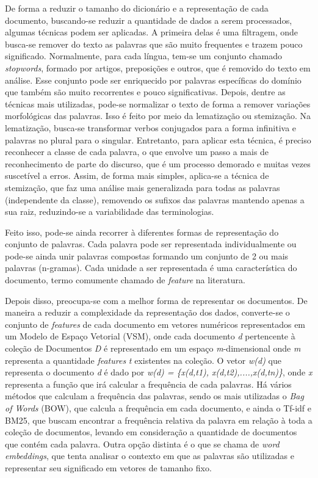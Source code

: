 De forma a reduzir o tamanho do dicionário e a representação de cada documento, buscando-se reduzir a quantidade de dados a serem processados, algumas técnicas podem ser aplicadas. A primeira delas é uma filtragem, onde busca-se remover do texto as palavras que são muito frequentes e trazem pouco significado. Normalmente, para cada língua, tem-se um conjunto chamado \textit{stopwords}, formado por artigos, preposições e outros, que é removido do texto em análise. Esse conjunto pode ser enriquecido por palavras específicas do domínio que também são muito recorrentes e pouco significativas. Depois, dentre as técnicas mais utilizadas, pode-se normalizar o texto de forma a remover variações morfológicas das palavras. Isso é feito por meio da lematização ou stemização. Na lematização, busca-se transformar verbos conjugados para a forma infinitiva e palavras no plural para o singular. Entretanto, para aplicar esta técnica, é preciso reconhecer a classe de cada palavra, o que envolve um passo a mais de reconhecimento de parte do discurso, que é um processo demorado e muitas vezes suscetível a erros. Assim, de forma mais simples, aplica-se a técnica de stemização, que faz uma análise mais generalizada para todas as palavras (independente da classe), removendo os sufixos das palavras mantendo apenas a sua raiz, reduzindo-se a variabilidade das terminologias. 

Feito isso, pode-se ainda recorrer à diferentes formas de representação do conjunto de palavras. Cada palavra pode ser representada individualmente ou pode-se ainda unir palavras compostas formando um conjunto de 2 ou mais palavras (n-gramas). Cada unidade a ser representada é uma característica do documento, termo comumente chamado de \textit{feature} na literatura.

Depois disso, preocupa-se com a melhor forma de representar os documentos.  De maneira a reduzir a complexidade da representação dos dados, converte-se o conjunto de \textit{features} de cada documento em vetores numéricos representados em um Modelo de Espaço Vetorial (VSM), onde cada documento \textit{d } pertencente à coleção de Documentos \textit{D} é representado em um espaço\textit{ m}-dimensional onde \textit{m} representa a quantidade \textit{features} \textit{t} existentes na coleção. O vetor \textit{w(d)} que representa o documento \textit{d} é dado por \textit{w(d) = \{x(d,t1), x(d,t2),....,x(d,tn)\}}, onde \textit{x} representa a função que irá calcular a frequência de cada palavras. Há vários métodos que calculam a frequência das palavras, sendo os mais utilizadas o \textit{Bag of Words} (BOW), que calcula a frequência em cada documento, e ainda o  Tf-idf e BM25, que buscam encontrar a frequência relativa da palavra em relação à toda a coleção de documentos, levando em consideração a quantidade de documentos que contém cada palavra.  Outra opção distinta é o que se chama de \textit{word embeddings}, que tenta analisar o contexto em que as palavras são utilizadas e representar seu significado em vetores de tamanho fixo. 

